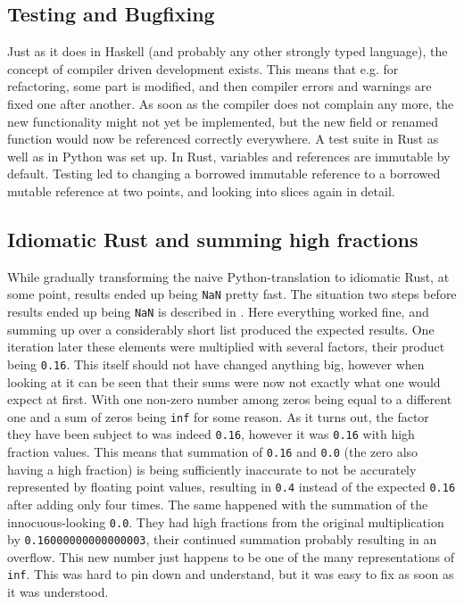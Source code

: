 \subsection{Testing and Bugfixing}

Just as it does in Haskell (and probably any other strongly typed language),
the concept of compiler driven development exists. This means that e.g. for
refactoring, some part is modified, and then compiler errors and warnings are
fixed one after another. As soon as the compiler does not complain any more,
the new functionality might not yet be implemented, but the new field or
renamed function would now be referenced correctly everywhere. A test suite in
Rust as well as in Python was set up. In Rust, variables and references are
immutable by default. Testing led to changing a borrowed immutable reference to
a borrowed mutable reference at two points, and looking into slices again in detail.


\subsection{Idiomatic Rust and summing high fractions}



While gradually transforming the naive Python-translation to idiomatic Rust, at
some point, results ended up being \verb|NaN| pretty fast. The situation two
steps before results ended up being \verb|NaN| is described in .
Here everything worked fine, and summing up over a considerably short list
produced the expected results. One iteration later these elements were
multiplied with several factors, their product being \verb|0.16|. This itself
should not have changed anything big, however when looking at 
it can be seen that their sums were now not exactly what one would expect at
first. With one non-zero number among zeros being equal to a different one and
a sum of zeros being \verb|inf| for some reason. As it turns out, the factor
they have been subject to was indeed \verb|0.16|, however it was \verb|0.16|
with high fraction values. This means that summation of \verb|0.16| and
\verb|0.0| (the zero also having a high fraction) is being sufficiently
inaccurate to not be accurately represented by floating point values, resulting
in \verb|0.4| instead of the expected \verb|0.16| after adding only four times.
The same happened with the summation of the innocuous-looking \verb|0.0|. They
had high fractions from the original multiplication by
\verb|0.16000000000000003|, their continued summation probably resulting in an
overflow. This new number just happens to be one of the many representations of
\verb|inf|. This was hard to pin down and understand, but it was easy to fix
as soon as it was understood.


